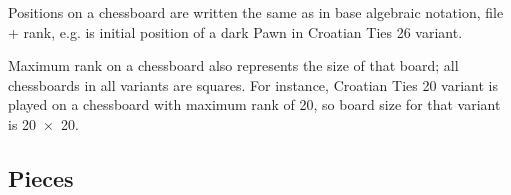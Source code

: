 Positions on a chessboard are written the same as in base algebraic notation, file +
rank, e.g.  is initial position of a dark Pawn in Croatian Ties 26 variant.

Maximum rank on a chessboard also represents the size of that board; all chessboards in
all variants are squares. For instance, Croatian Ties 20 variant is played on a chessboard
with maximum rank of 20, so board size for that variant is \mbox{20~$\times$~20}.


\subsection*{Pieces}
\label{sec:Simple variants/Summary/Pieces}



